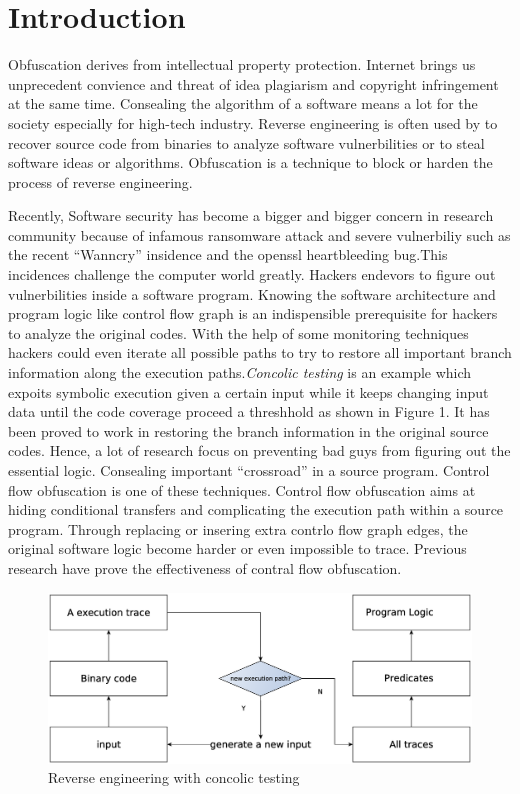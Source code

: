 \documentclass[lnicst]{svmultln}
\begin{document}
\section{Introduction}
%
Obfuscation derives from intellectual property protection. Internet brings us unprecedent convience and threat of idea plagiarism and copyright infringement at the same time.  Consealing the algorithm of a software means a lot for the society especially for high-tech industry. Reverse engineering is often used by to recover source code from binaries to analyze software vulnerbilities or to steal software ideas or algorithms. Obfuscation is a technique to block or harden the process of reverse engineering.

Recently, Software security has become a bigger and bigger concern in research community because of infamous ransomware attack and severe vulnerbiliy such as the recent ``Wanncry'' insidence and the openssl heartbleeding bug.This incidences challenge the computer world greatly. Hackers endevors to figure out vulnerbilities inside a software program. Knowing the software architecture and program logic like control flow graph is an indispensible prerequisite for hackers to analyze the original codes. With the help of some monitoring techniques hackers could even iterate all possible paths to try to restore all important branch information along the execution paths.\textit{Concolic testing} is an example which expoits symbolic execution given a certain input while it keeps changing input data until the code coverage proceed a threshhold\cite{Sen} as shown in Figure 1. It has been proved to work in restoring the branch information in the original source codes. Hence, a lot of research focus on preventing bad guys from figuring out the essential logic. Consealing important ``crossroad'' in a source program. Control flow obfuscation is one of these techniques. Control flow obfuscation aims at hiding conditional transfers and complicating the execution path within a source program. Through replacing or insering extra contrlo flow graph edges, the original software logic become harder or even impossible to trace. Previous research\cite{Ma} have prove the effectiveness of contral flow obfuscation.

\begin{figure}
  \includegraphics[width=0.9\linewidth]{reverse_engineering.eps}
  \caption{Reverse engineering with concolic testing}
  \label{Figure 1}
\end{figure}
\end{document}
